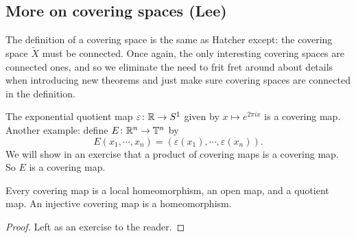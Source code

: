 \subsection{More on covering spaces (Lee)}
The definition of a covering space is the same as Hatcher except: the covering space $\widetilde X$ must be connected. Once again, the only interesting covering spaces are connected ones, and so we eliminate the need to frit fret around about details when introducing new theorems and just make sure covering spaces are connected in the definition.
\begin{example}
    The exponential quotient map $\varepsilon \colon \mathbb{R} \to S^{1} $ given by $x \mapsto e^{2\pi ix}$ is a covering map. Another example: define $E \colon \mathbb{R}^n \to \mathbb{T}^n$ by \[
        E(x_1,\cdots,x_n)=(\varepsilon(x_1),\cdots,\varepsilon(x_n)).
    \] We will show in an exercise that a product of covering maps is a covering map. So $E$ is a covering map.
\end{example}
\begin{lemma}
   Every covering map is a local homeomorphism, an open map, and a quotient map. An injective covering map is a homeomorphism.
\end{lemma}
\begin{proof}
    Left as an exercise to the reader.
\end{proof}
\newpage
